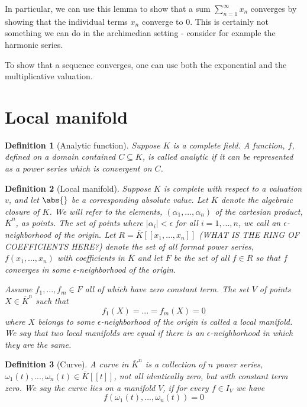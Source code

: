 \documentclass{article}
\newtheorem{definition}{Definition}[section]
\begin{document}
In particular, we can use this lemma to show that a sum $\sum_{n=1}^\infty x_n$ converges by showing that the individual terms $x_n$ converge to 0. This is certainly not something we can do in the archimedian setting - consider for example the harmonic series. 


To show that a sequence converges, one can use both the exponential and the multiplicative valuation. 



\section{Local manifold}

\begin{definition}[Analytic function]
    Suppose $K$ is a complete field. A function, $f$, defined on a domain contained $C \subseteq K$, is called analytic if it can be represented as a power series which is convergent on $C$.
\end{definition}

\begin{definition}[Local manifold] \label{def: Local manifold}
    Suppose $K$ is complete with respect to a valuation $v$, and let $\abs{}$ be a corresponding absolute value. Let $\overline K$ denote the algebraic closure of $K$. We will refer to the elements, $(\alpha_1, ..., \alpha_n)$ of the cartesian product, $\overline K^n$, as points. The set of points where $|\alpha_i| < \epsilon$ for all $i = 1, ..., n$, we call an $\epsilon$-neighborhood of the origin. Let $R = \overline K[[x_1, ..., x_n]]$ (WHAT IS THE RING OF COEFFICIENTS HERE?) denote the set of all format power series, $f(x_1, ..., x_n)$ with coefficients in $\overline K$ and let $F$ be the set of all $f \in R$ so that $f$ converges in some $\epsilon$-neighborhood of the origin.

    Assume $f_1, ..., f_m \in F$ all of which have zero constant term. The set $V$ of points $X \in \overline {K}^n$ such that $$f_1(X) = ... = f_m(X) = 0$$
    where $X$ belongs to some $\epsilon$-neighborhood of the origin is called a local manifold. We say that two local manifolds are equal if there is an $\epsilon$-neighborhood in which they are the same.
\end{definition}

\begin{definition}[Curve]
    A curve in $\overline K^n$ is a collection of $n$ power series, $\omega_1(t), ..., \omega_n(t) \in \overline K[[t]]$, not all identically zero, but with constant term zero. We say the curve lies on a manifold $V$, if for every $f \in I_V$ we have $$f(\omega_1(t), ..., \omega_n(t)) = 0$$
\end{definition}
\end{document}
